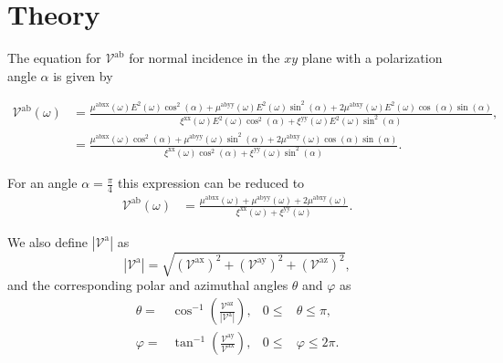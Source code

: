 \documentclass[twocolumn]{article}
\let\Oldsection\section
\renewcommand{\section}{\FloatBarrier\Oldsection}
\begin{document}
\section{Theory} %
\label{sec:theory}
The equation for $\mathcal{V}^{\mathrm{ab}}$ for normal incidence in the $xy$
plane with a polarization angle $\alpha$ is given by

\begin{strip}
\begin{align}
\mathcal{V}^{\mathrm{ab}} (\omega) 
&= \frac{\mu^{\mathrm{abxx}}(\omega)
E^{2}(\omega)\cos^{2}(\alpha) + 
\mu^{\mathrm{abyy}}(\omega)
E^{2}(\omega)\sin^{2}(\alpha) + 
2\mu^{\mathrm{abxy}}(\omega)
E^{2}(\omega)\cos(\alpha)\sin(\alpha)}
{\xi^{\mathrm{xx}}(\omega)
E^{2}(\omega)\cos^{2}(\alpha) + 
\xi^{\mathrm{yy}}(\omega)
E^{2}(\omega)\sin^{2}(\alpha)},
\nonumber \\
&= \frac{\mu^{\mathrm{abxx}}(\omega)\cos^{2}(\alpha) + 
\mu^{\mathrm{abyy}}(\omega)\sin^{2}(\alpha) + 
2\mu^{\mathrm{abxy}}(\omega)\cos(\alpha)\sin(\alpha)}
{\xi^{\mathrm{xx}}(\omega)\cos^{2}(\alpha) + 
\xi^{\mathrm{yy}}(\omega)\sin^{2}(\alpha)}.
\label{eq:vab}
\end{align}
\end{strip}

For an angle $\alpha = \frac{\pi}{4}$ this expression can be reduced to 
\begin{align}
\mathcal{V}^{\mathrm{ab}} (\omega)
&= \frac{\mu^{\mathrm{abxx}}(\omega) + \mu^{\mathrm{abyy}}(\omega) + 
2\mu^{\mathrm{abxy}}(\omega)}
{\xi^{\mathrm{xx}}(\omega) + \xi^{\mathrm{yy}}(\omega)}.
\label{eq:vab-90deg}
\end{align}

We also define $|\mathcal{V}^{\mathrm{a}}|$ as 
\begin{equation}\label{eq:va-mag}
|\mathcal{V}^{\mathrm{a}}| = 
\sqrt {
(\mathcal{V}^{\mathrm{ax}})^{2} +
(\mathcal{V}^{\mathrm{ay}})^{2} +
(\mathcal{V}^{\mathrm{az}})^{2} 
},
\end{equation}
and the corresponding polar and azimuthal angles $\theta$ and $\varphi$ as
\begin{align}
\theta  =& \cos^{-1} \left(  \frac{\mathcal{V}^{\mathrm{az}}}
{|\mathcal{V}^{\mathrm{a}}|} \right),
& 0 \leq &\theta \leq \pi, 
\label{eq:polar-ang} \\
\varphi =& \tan^{-1} \left( \frac{\mathcal{V}^{\mathrm{ay}}}{\mathcal{V}^{\mathrm{ax}}} \right),
& 0 \leq &\varphi \leq 2\pi. \\ 
\label{eq:azimuthal-ang} 
\end{align}
\end{document}
